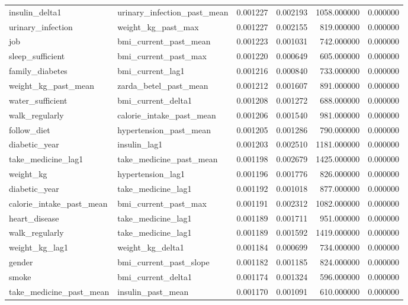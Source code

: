 \begin{longtable}{llrrrr}
insulin\_delta1 & urinary\_infection\_past\_mean & 0.001227 & 0.002193 & 1058.000000 & 0.000000 \\
urinary\_infection & weight\_kg\_past\_max & 0.001227 & 0.002155 & 819.000000 & 0.000000 \\
job & bmi\_current\_past\_mean & 0.001223 & 0.001031 & 742.000000 & 0.000000 \\
sleep\_sufficient & bmi\_current\_past\_max & 0.001220 & 0.000649 & 605.000000 & 0.000000 \\
family\_diabetes & bmi\_current\_lag1 & 0.001216 & 0.000840 & 733.000000 & 0.000000 \\
weight\_kg\_past\_mean & zarda\_betel\_past\_mean & 0.001212 & 0.001607 & 891.000000 & 0.000000 \\
water\_sufficient & bmi\_current\_delta1 & 0.001208 & 0.001272 & 688.000000 & 0.000000 \\
walk\_regularly & calorie\_intake\_past\_mean & 0.001206 & 0.001540 & 981.000000 & 0.000000 \\
follow\_diet & hypertension\_past\_mean & 0.001205 & 0.001286 & 790.000000 & 0.000000 \\
diabetic\_year & insulin\_lag1 & 0.001203 & 0.002510 & 1181.000000 & 0.000000 \\
take\_medicine\_lag1 & take\_medicine\_past\_mean & 0.001198 & 0.002679 & 1425.000000 & 0.000000 \\
weight\_kg & hypertension\_lag1 & 0.001196 & 0.001776 & 826.000000 & 0.000000 \\
diabetic\_year & take\_medicine\_lag1 & 0.001192 & 0.001018 & 877.000000 & 0.000000 \\
calorie\_intake\_past\_mean & bmi\_current\_past\_max & 0.001191 & 0.002312 & 1082.000000 & 0.000000 \\
heart\_disease & take\_medicine\_lag1 & 0.001189 & 0.001711 & 951.000000 & 0.000000 \\
walk\_regularly & take\_medicine\_lag1 & 0.001189 & 0.001592 & 1419.000000 & 0.000000 \\
weight\_kg\_lag1 & weight\_kg\_delta1 & 0.001184 & 0.000699 & 734.000000 & 0.000000 \\
gender & bmi\_current\_past\_slope & 0.001182 & 0.001185 & 824.000000 & 0.000000 \\
smoke & bmi\_current\_delta1 & 0.001174 & 0.001324 & 596.000000 & 0.000000 \\
take\_medicine\_past\_mean & insulin\_past\_mean & 0.001170 & 0.001091 & 610.000000 & 0.000000 \\

\end{longtable}
